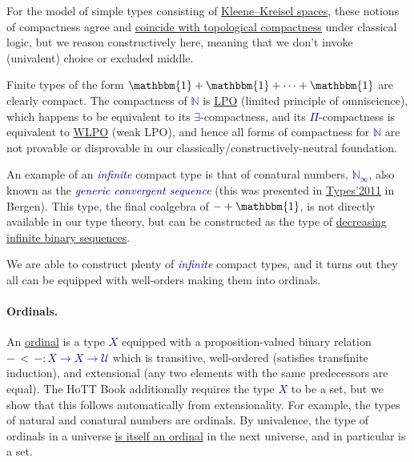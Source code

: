 \documentclass[a4paper]{easychair}
\newcommand{\db}{\textcolor{darkblue}}
\newcommand{\df}[1]{\emph{\db{#1}}}
\newcommand{\m}[1]{\db{$#1$}}
\newcommand{\N}{\mathbb{N}}
\newcommand{\NI}{\N_\infty}
\newcommand{\U}{\mathcal{U}}
\newcommand{\One}{\mathbbm{1}}
\begin{document}
For the model of simple types consisting of
\href{https://www.springer.com/gb/book/9783662479919}{Kleene--Kreisel
  spaces}, these notions of compactness agree and
\href{https://lmcs.episciences.org/693}{coincide with topological
  compactness} under classical logic, but we reason constructively
here, meaning that we don't invoke (univalent) choice or excluded
middle.

Finite types of the form \m{\One + \One + \cdots + \One} are clearly
compact. The compactness of \m{\N} is
\href{https://plato.stanford.edu/entries/mathematics-constructive/}{LPO}
(limited principle of omniscience), which happens to be equivalent to
its \m{\exists}-compactness, and its \m{\Pi}-compactness is equivalent
to
\href{https://journals.openedition.org/philosophiascientiae/406}{WLPO}
(weak LPO), and hence all forms of compactness for \m{\N} are not
provable or disprovable in our classically/constructively-neutral
foundation.

An example of an \df{infinite} compact type is that of conatural
numbers, \m{\NI}, also known as the \df{generic convergent sequence}
(this was presented in
\href{https://sites.google.com/site/types2011/program}{Types'2011} in
Bergen).  This type, the final coalgebra of \m{- + \One}, is not
directly available in our type theory, but can be constructed as the
type of
\href{https://www.cambridge.org/core/journals/journal-of-symbolic-logic/article/infinite-sets-that-satisfy-the-principle-of-omniscience-in-any-variety-of-constructive-mathematics/0D204ADE629B703578B848B8573FC83D}{decreasing
  infinite binary sequences}.

We are able to construct plenty of \df{infinite} compact types, and it
turns out they all can be equipped with well-orders making them into
ordinals.

\paragraph{Ordinals.}
An \href{https://homotopytypetheory.org/book/}{ordinal} is a type
\m{X} equipped with a proposition-valued binary relation
\m{{-}\,{<}\,{-} : X \to X \to \U} which is transitive, well-ordered
(satisfies transfinite induction), and extensional (any two elements
with the same predecessors are equal). The HoTT Book additionally
requires the type \m{X} to be a set, but we show that this follows
automatically from extensionality. For example, the types of natural
and conatural numbers are ordinals. By univalence, the type of
ordinals in a universe \href{https://homotopytypetheory.org/book/}{is
  itself an ordinal} in the next universe, and in particular is a set.
\end{document}

